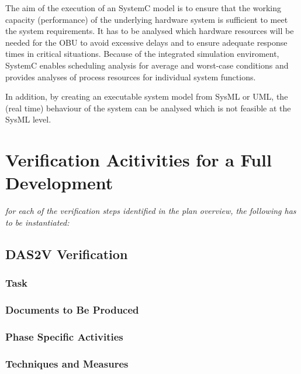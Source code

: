 \documentclass{template/openetcs_report}
\begin{document}
The aim of the execution of an SystemC model is to ensure that the working capacity (performance) of the underlying hardware system is sufficient to meet the system requirements. It has to be analysed which hardware resources will be needed for the OBU to avoid excessive delays and to ensure adequate response times in critical situations.  Because of the integrated simulation enviroment, SystemC enables scheduling analysis for average and worst-case conditions and provides analyses of process resources for individual system functions.

In addition, by creating an executable system model from SysML or UML, the (real time) behaviour of the system can be analysed which is not feasible at the SysML level.




\section{Verification Acitivities for a Full Development}
\label{sec:verif-full-devel}

\textit{for each of the verification steps identified in the plan
  overview, the following has to be instantiated: }
\subsection{DAS2V Verification}
\label{sec:dasv-verification}

\subsubsection{Task}
\label{sec:dasv-verif-task}

\subsubsection{Documents to Be Produced}
\label{sec:dasv-verif-docum-be-prod}

\subsubsection{Phase Specific Activities}
\label{sec:dasv-verif-phase-spec-activ}

\subsubsection{Techniques and Measures}
\label{sec:dasv-verif-techniques-measures}
\end{document}
